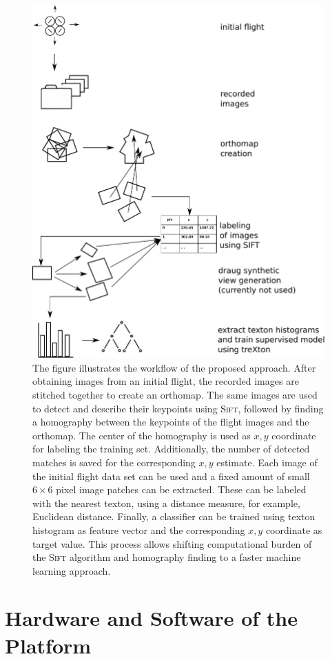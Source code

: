\begin{figure}[h!]
\begin{center}
\includegraphics[width=0.7\columnwidth]{figures/overview}
\caption{{\label{fig:overview} The figure illustrates
    the workflow of the proposed approach. After obtaining images from an initial flight,
    the recorded images are stitched together to create an orthomap. The same
    images are used to detect and describe their keypoints using
    \textsc{Sift}, followed by finding a homography between the keypoints of the flight
    images and the orthomap. The center of the homography is used as
    $x, y$ coordinate for labeling the training set. Additionally, the
    number of detected matches is saved for the corresponding $x, y$
    estimate. Each image of the initial flight data set can be used
    and a fixed amount of small $6\times6$ pixel image patches can be
    extracted. These can be labeled with the nearest texton, using a
    distance measure, for example, Euclidean distance. Finally, a
    classifier can be trained using texton histogram as feature vector
    and the corresponding $x, y$ coordinate as target value. This
    process allows shifting computational burden of the \textsc{Sift}
    algorithm and homography finding to a faster machine learning
    approach.%
}}
\end{center}
\end{figure}

\section{Hardware and Software of the Platform}
\label{sec:hardware}

